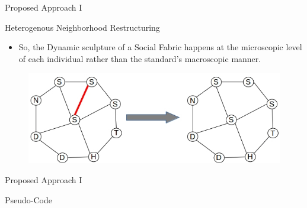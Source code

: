 \documentclass[table]{beamer}
\begin{document}
	\begin{frame}{Proposed Approach I}
		\begin{block}{Heterogenous Neighborhood Restructuring}
			\begin{itemize}
				\item So, the Dynamic sculpture of a Social Fabric happens at the microscopic level of each individual rather than the standard's macroscopic manner.
			\end{itemize}
		\end{block}
			\begin{figure}[v]
				\includegraphics[scale=0.6]{heterogenous}
				\centering
				\caption{}
				\label{ref:heterogenous}
			\end{figure}				
	\end{frame}
		
	\begin{frame}{Proposed Approach I}
		\begin{block}{Pseudo-Code}
		\end{block}
	\end{frame}
		
\end{document}

